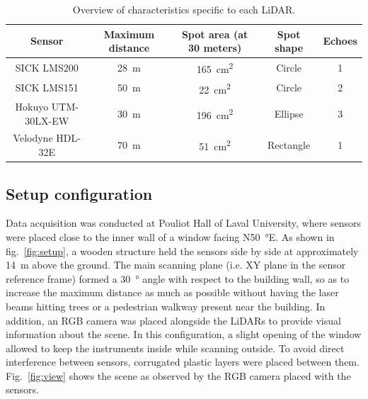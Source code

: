 \begin{table}[htbp]
    \centering
    \begin{tabular}{|c|c|c|c|c|}
        \hline
        \textbf{Sensor}     & \textbf{Maximum distance}  & \textbf{Spot area (at 30 meters)}  & \textbf{Spot shape} & \textbf{Echoes} \\\hline
        SICK LMS200         & \SI{28}{\meter}            & \SI{165}{\centi\meter\squared}     & Circle              & 1               \\\hline
        SICK LMS151         & \SI{50}{\meter}            & \SI{22}{\centi\meter\squared}      & Circle              & 2               \\\hline
        Hokuyo UTM-30LX-EW  & \SI{30}{\meter}            & \SI{196}{\centi\meter\squared}     & Ellipse             & 3               \\\hline
        Velodyne HDL-32E    & \SI{70}{\meter}            & \SI{51}{\centi\meter\squared}      & Rectangle           & 1               \\\hline
    \end{tabular}
    \caption{Overview of characteristics specific to each LiDAR.}
    \label{tab:lidars}
\end{table}

\subsection{Setup configuration}

Data acquisition was conducted at Pouliot Hall of Laval University, where sensors were placed close to the inner wall of a window facing N\SI{50}{\degree}E. As shown in fig.~\ref{fig:setup}, a wooden structure held the sensors side by side at approximately \SI{14}{\meter} above the ground. The main scanning plane (i.e. XY plane in the sensor reference frame) formed a \SI{30}{\degree} angle with respect to the building wall, so as to increase the maximum distance as much as possible without having the laser beams hitting  trees or a pedestrian walkway present near the building. In addition, an RGB camera was placed alongside the LiDARs to provide visual information about the scene. In this configuration, a slight opening of the window allowed to keep the instruments inside while scanning outside. To avoid direct interference between sensors, corrugated plastic layers were placed between them. Fig.~\ref{fig:view} shows the scene as observed by the RGB camera placed with the sensors.

